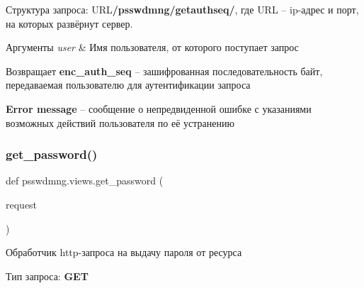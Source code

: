 Структура запроса\+: {\ttfamily U\+RL{\bfseries /psswdmng/getauthseq/}}, где {\ttfamily U\+RL} – ip-\/адрес и порт, на которых развёрнут сервер. 
\begin{DoxyParams}{Аргументы}
{\em user} & Имя пользователя, от которого поступает запрос \\
\hline
\end{DoxyParams}
\begin{DoxyReturn}{Возвращает}
{\bfseries enc\+\_\+auth\+\_\+seq} – зашифрованная последовательность байт, передаваемая пользователю для аутентификации запроса 

{\bfseries Error message} – сообщение о непредвиденной ошибке с указаниями возможных действий пользователя по её устранению 
\end{DoxyReturn}
\mbox{\label{namespacepsswdmng_1_1views_ac84061d736cf49b655050b89b9e2fe2a}} 
\subsubsection{get\+\_\+password()}
{\footnotesize\ttfamily def psswdmng.\+views.\+get\+\_\+password (\begin{DoxyParamCaption}\item[{}]{request }\end{DoxyParamCaption})}



Обработчик http-\/запроса на выдачу пароля от ресурса 

Тип запроса\+: {\bfseries G\+ET} 

